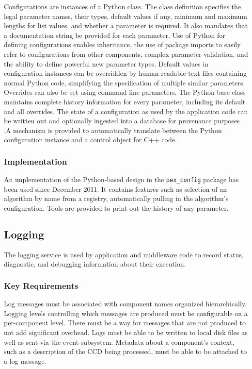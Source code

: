 \documentclass[DM,lsstdraft,toc]{lsstdoc}
\begin{document}
Configurations are instances of a Python class. The class definition
specifies the legal parameter names, their types, default values if any,
minimum and maximum lengths for list values, and whether a parameter is
required. It also mandates that a documentation string be provided for
each parameter. Use of Python for defining configurations enables
inheritance, the use of package imports to easily refer to
configurations from other components, complex parameter validation, and
the ability to define powerful new parameter types. Default values in
configuration instances can be overridden by human-readable text files
containing normal Python code, simplifying the specification of multiple
similar parameters. Overrides can also be set using command line
parameters. The Python base class maintains complete history information
for every parameter, including its default and all overrides. The state
of a configuration as used by the application code can be written out
and optionally ingested into a database for provenance purposes .A
mechanism is provided to automatically translate between the Python
configuration instance and a control object for C++ code.

\subsubsection{Implementation}\label{configuration-implementation}

An implementation of the Python-based design in the \texttt{pex\_config}
package has been used since December 2011. It contains features such as
selection of an algorithm by name from a registry, automatically pulling in the
algorithm's configuration. Tools are provided to print out the history of any
parameter.


\subsection{Logging}\label{logging}

The logging service is used by application and middleware code to record
status, diagnostic, and debugging information about their execution.

\subsubsection{Key Requirements}\label{logging-reqs}

Log messages must be associated with component names organized
hierarchically. Logging levels controlling which messages are produced
must be configurable on a per-component level. There must be a way for
messages that are not produced to not add significant overhead.
Logs must be able to
be written to local disk files as well as sent via the event subsystem.
Metadata about a component's context, such as a description of the CCD
being processed, must be able to be attached to a log message.
\end{document}
